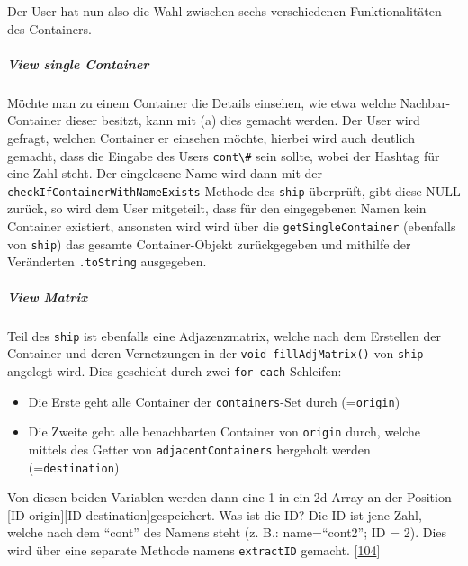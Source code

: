\documentclass[
    headings=optiontotocandhead,%
    twoside,
    numbers=noenddot,%
    12pt, %
    titlepage, %
    parskip=full, %
    listof=leveldown, 
    numbers=noenddot, %
    a4paper,DIV=14,
    BCOR=15mm,
]{scrbook}
\newcommand{\passthrough}[1]{#1}
\providecommand{\tightlist}{%
  \setlength{\itemsep}{0pt}\setlength{\parskip}{0pt}}
\begin{document}
Der User hat nun also die Wahl zwischen sechs verschiedenen
Funktionalitäten des Containers.

\hypertarget{view-single-container}{%
\subparagraph{View single Container}\label{view-single-container}}

Möchte man zu einem Container die Details einsehen, wie etwa welche
Nachbar-Container dieser besitzt, kann mit (a) dies gemacht werden. Der
User wird gefragt, welchen Container er einsehen möchte, hierbei wird
auch deutlich gemacht, dass die Eingabe des Users
\passthrough{\lstinline!cont\#!} sein sollte, wobei der Hashtag für eine
Zahl steht. Der eingelesene Name wird dann mit der
\passthrough{\lstinline!checkIfContainerWithNameExists!}-Methode des
\passthrough{\lstinline!ship!} überprüft, gibt diese NULL zurück, so
wird dem User mitgeteilt, dass für den eingegebenen Namen kein Container
existiert, ansonsten wird wird über die
\passthrough{\lstinline!getSingleContainer!} (ebenfalls von
\passthrough{\lstinline!ship!}) das gesamte Container-Objekt
zurückgegeben und mithilfe der Veränderten
\passthrough{\lstinline!.toString!} ausgegeben.

\hypertarget{view-matrix}{%
\subparagraph{View Matrix}\label{view-matrix}}

Teil des \passthrough{\lstinline!ship!} ist ebenfalls eine
Adjazenzmatrix, welche nach dem Erstellen der Container und deren
Vernetzungen in der \passthrough{\lstinline!void fillAdjMatrix()!} von
\passthrough{\lstinline!ship!} angelegt wird. Dies geschieht durch zwei
\passthrough{\lstinline!for-each!}-Schleifen:

\begin{itemize}
\tightlist
\item
  Die Erste geht alle Container der
  \passthrough{\lstinline!containers!}-Set durch
  (=\passthrough{\lstinline!origin!})
\item
  Die Zweite geht alle benachbarten Container von
  \passthrough{\lstinline!origin!} durch, welche mittels des Getter von
  \passthrough{\lstinline!adjacentContainers!} hergeholt werden
  (=\passthrough{\lstinline!destination!})
\end{itemize}

Von diesen beiden Variablen werden dann eine 1 in ein 2d-Array an der
Position {[}ID-origin{]}{[}ID-destination{]}gespeichert. Was ist die ID?
Die ID ist jene Zahl, welche nach dem ``cont'' des Namens steht (z. B.:
name=``cont2''; ID = 2). Dies wird über eine separate Methode namens
\passthrough{\lstinline!extractID!} gemacht.
{[}\protect\hyperlink{ref-gpt-IdExtractor}{104}{]}
\end{document}
